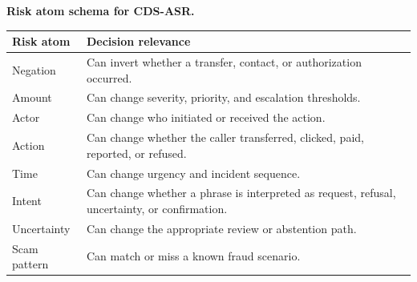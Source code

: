 \begin{center}
\noindent\textbf{Risk atom schema for CDS-ASR.}

\begin{tabularx}{\linewidth}{@{}lL@{}}
\toprule
Risk atom & Decision relevance \\
\midrule
Negation & Can invert whether a transfer, contact, or authorization occurred. \\
Amount & Can change severity, priority, and escalation thresholds. \\
Actor & Can change who initiated or received the action. \\
Action & Can change whether the caller transferred, clicked, paid, reported, or refused. \\
Time & Can change urgency and incident sequence. \\
Intent & Can change whether a phrase is interpreted as request, refusal, uncertainty, or confirmation. \\
Uncertainty & Can change the appropriate review or abstention path. \\
Scam pattern & Can match or miss a known fraud scenario. \\
\bottomrule
\end{tabularx}
\end{center}
